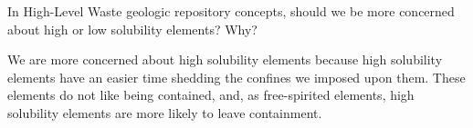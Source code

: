 \documentclass[11pt,answers,addpoints]{exam}
\begin{document}
\begin{questions}
        \question[30] 
        In High-Level Waste geologic repository concepts, should we be 
        more concerned about high or low solubility elements? Why?

        \begin{solution}
        We are more concerned about high solubility elements because high solubility elements have an easier time shedding the confines we imposed upon them. These elements do not like being contained, and, as free-spirited elements, high solubility elements are more likely to leave containment.
        \end{solution}


\end{questions}
\end{document}
